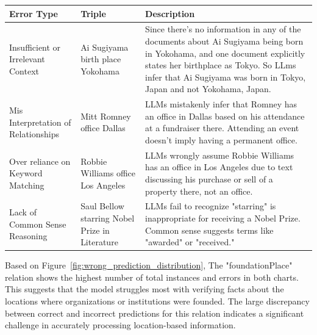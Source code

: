 \begin{table}[h!]
    \footnotesize
    \caption{Example of failure cases and error analysis observed in the FactBench dataset using generated results and explanations.}
    \begin{xltabular}{\linewidth}{p{3cm}p{3cm}X}
        \toprule
        \textbf{Error Type} & \textbf{Triple} & \textbf{Description} \\
        \midrule
        Insufficient or Irrelevant Context & Ai Sugiyama birth place Yokohama & Since there's no information in any of the documents about Ai Sugiyama being born in Yokohama, and one document explicitly states her birthplace as Tokyo. So LLms infer that Ai Sugiyama was born in Tokyo, Japan and not Yokohama, Japan. \\\hline
        Mis Interpretation of Relationships & Mitt Romney office Dallas & LLMs mistakenly infer that Romney has an office in Dallas based on his attendance at a fundraiser there. Attending an event doesn't imply having a permanent office. \\\hline
        Over reliance on Keyword Matching & Robbie Williams office Los Angeles & LLMs wrongly assume Robbie Williams has an office in Los Angeles due to text discussing his purchase or sell of a property there, not an office. \\\hline
        Lack of Common Sense Reasoning & Saul Bellow starring Nobel Prize in Literature & LLMs fail to recognize "starring" is inappropriate for receiving a Nobel Prize. Common sense suggests terms like "awarded" or "received." \\
        \bottomrule
    \end{xltabular}
    \label{tab:factbench-failure-analysis}
\end{table}

Based on Figure~\ref{fig:wrong_prediction_distribution}, The "foundationPlace" relation shows the highest number of total instances and errors in both charts.
This suggests that the model struggles most with verifying facts about the locations where organizations or institutions were founded.
The large discrepancy between correct and incorrect predictions for this relation indicates a significant challenge in accurately processing location-based information.


